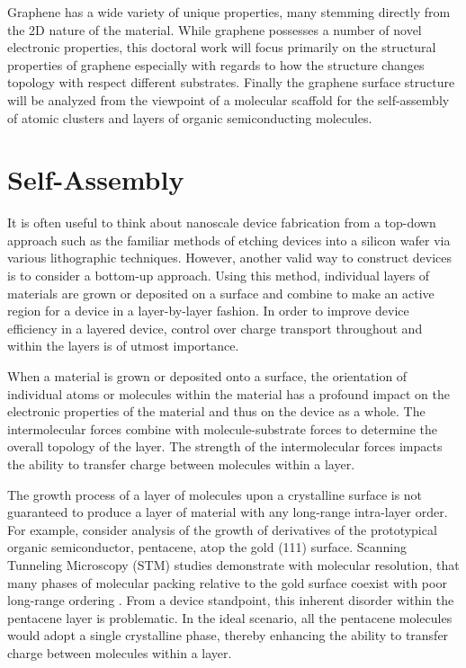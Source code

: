 Graphene has a wide variety of unique properties, many stemming directly from the 2D nature of the material. While graphene possesses a number of novel electronic properties, this doctoral work will focus primarily on the structural properties of graphene especially with regards to how the structure changes topology with respect different substrates. Finally the graphene surface structure will be analyzed from the viewpoint of a molecular scaffold for the self-assembly of atomic clusters and layers of organic semiconducting molecules.

\section{Self-Assembly}

It is often useful to think about nanoscale device fabrication from a top-down approach such as the familiar methods of etching devices into a silicon wafer via various lithographic techniques. However, another valid way to construct devices is to consider a bottom-up approach. Using this method, individual layers of materials are grown or deposited on a surface and combine to make an active region for a device in a layer-by-layer fashion. In order to improve device efficiency in a layered device, control over charge transport throughout and within the layers is of utmost importance.

When a material is grown or deposited onto a surface, the orientation of individual atoms or molecules within the material has a profound impact on the electronic properties of the material and thus on the device as a whole. The intermolecular forces combine with molecule-substrate forces to determine the overall topology of the layer. The strength of the intermolecular forces impacts the ability to transfer charge between molecules within a layer.

The growth process of a layer of molecules upon a crystalline surface is not guaranteed to produce a layer of material with any long-range intra-layer order. For example, consider analysis of the growth of derivatives of the prototypical organic semiconductor, pentacene, atop the gold (111) surface.  Scanning Tunneling Microscopy (STM) studies demonstrate with molecular resolution, that many phases of molecular packing relative to the gold surface coexist with poor long-range ordering \cite{wang-nano}. From a device standpoint, this inherent disorder within the pentacene layer is problematic. In the ideal scenario, all the pentacene molecules would adopt a single crystalline phase, thereby enhancing the ability to transfer charge between molecules within a layer.

